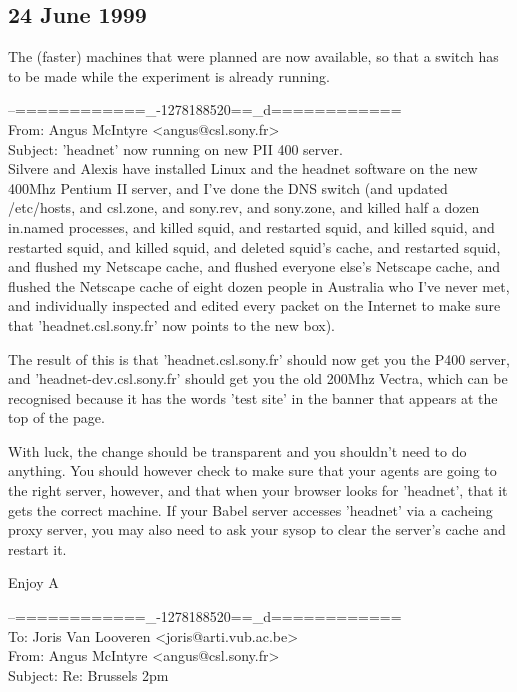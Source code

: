 \subsection*{24 June 1999}

The (faster) machines that were planned are now available, so that a switch has to be made while the 
experiment is already running. 
\newline
{
\begin{mail}
--============\_-1278188520==\_d============\\
From: Angus McIntyre <angus@csl.sony.fr>\\
Subject: 'headnet' now running on new PII 400 server.\\

Silvere and Alexis have installed Linux and the headnet software on the 
new 400Mhz Pentium II server, and I've done the DNS switch (and updated
/etc/hosts, and csl.zone, and sony.rev, and sony.zone, and killed half 
a dozen in.named processes, and killed squid, and restarted 
squid, and killed squid, and restarted squid, and killed squid, 
and deleted squid's cache, and restarted squid, and flushed my Netscape
cache, and flushed everyone else's Netscape cache, and flushed the 
Netscape cache of eight dozen people in Australia who I've never 
met, and individually inspected and edited every packet on the 
Internet to make sure that 'headnet.csl.sony.fr' now points to the new box).

The result of this is that 'headnet.csl.sony.fr' should now get 
you the P400 server, and 'headnet-dev.csl.sony.fr' should get you the 
old 200Mhz Vectra, which can be recognised because it has the words 'test 
site' in the banner that appears at the top of the page.

With luck, the change should be transparent and you shouldn't need 
to do anything. You should however check to make sure that your agents 
are going to the right server, however, and that when your browser looks 
for 'headnet', that it gets the correct machine. If your Babel server 
accesses 'headnet' via a cacheing proxy server, you may also need to 
ask your sysop to clear the server's cache and restart it.

Enjoy 
A
\end{mail}
\clearpage
\begin{mail} 
--============\_-1278188520==\_d============\\
To: Joris Van Looveren <joris@arti.vub.ac.be>\\
From: Angus McIntyre <angus@csl.sony.fr>\\
Subject: Re: Brussels 2pm\\


\end{mail}}
